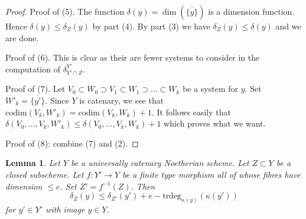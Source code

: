 \documentclass{stacks-project}
\theoremstyle{plain}
\newtheorem{lemma}[subsection]{Lemma}
\theoremstyle{definition}
\theoremstyle{remark}
\numberwithin{equation}{subsection}
\begin{document}
\begin{proof}
\medskip\noindent
Proof of (5). The function $\delta(y) = \dim(\overline{\{y\}})$
is a dimension function. Hence $\delta(y) \leq \delta_Z(y)$ by
part (4). By part (3) we have $\delta_Z(y) \leq \delta(y)$
and we are done.

\medskip\noindent
Proof of (6). This is clear as their are fewer systems to consider
in the computation of $\delta^{Y'}_{Y' \cap Z}$.

\medskip\noindent
Proof of (7). Let
$V_0 \subset W_0 \supset V_1 \subset W_1 \supset \ldots \subset W_k$
be a system for $y$. Set $W'_k = \overline{\{y'\}}$.
Since $Y$ is catenary, we see that
$\text{codim}(V_k, W'_k) = \text{codim}(V_k, W_k) + 1$.
It follows easily that $\delta(V_0, \ldots, V_k, W'_k) \leq
\delta(V_0, \ldots, V_k, W_k) + 1$ which proves what we want.

\medskip\noindent
Proof of (8): combine (7) and (2).
\end{proof}

\begin{lemma}
\label{lemma-change-distance-function}
Let $Y$ be a universally catenary Noetherian scheme. Let $Z \subset Y$
be a closed subscheme. Let $f : Y' \to Y$ be a finite type
morphism all of whose fibres have dimension $\leq e$. Set $Z' = f^{-1}(Z)$.
Then
$$
\delta_Z(y) \leq \delta_{Z'}(y') + e - \text{trdeg}_{\kappa(y)}(\kappa(y'))
$$
for $y' \in Y'$ with image $y \in Y$.
\end{lemma}
\end{document}
